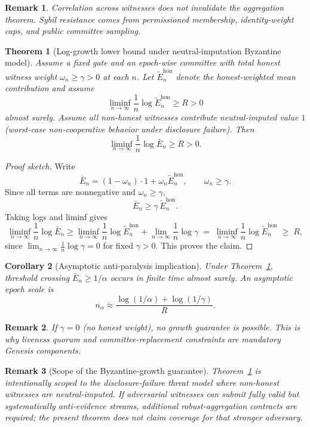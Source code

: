 \documentclass[11pt,a4paper]{article}
\newtheorem{theorem}{Theorem}[section]
\newtheorem{corollary}[theorem]{Corollary}
\newtheorem{remark}{Remark}[section]
\begin{document}
\begin{remark}
Correlation across witnesses does not invalidate the aggregation theorem.
Sybil resistance comes from permissioned membership, identity-weight caps, and public committee sampling.
\end{remark}

\begin{theorem}[Log-growth lower bound under neutral-imputation Byzantine model]
\label{thm:byz-growth}
Assume a fixed gate and an epoch-wise committee with total honest witness weight $\omega_n\ge\gamma>0$ at each $n$.
Let $\widetilde E_n^{\mathrm{hon}}$ denote the honest-weighted mean contribution and assume
\[
\liminf_{n\to\infty}\frac{1}{n}\log \widetilde E_n^{\mathrm{hon}}\ge R>0
\]
almost surely.
Assume all non-honest witnesses contribute neutral-imputed value $1$ (worst-case non-cooperative behavior under disclosure failure).
Then
\[
\liminf_{n\to\infty}\frac{1}{n}\log \bar E_n
\ge R>0.
\]
\end{theorem}
\begin{proof}[Proof sketch]
Write
\[
\bar E_n=(1-\omega_n)\cdot 1+\omega_n\widetilde E_n^{\mathrm{hon}},\qquad \omega_n\ge\gamma.
\]
Since all terms are nonnegative and $\omega_n\ge\gamma$,
\[
\bar E_n\ge \gamma\,\widetilde E_n^{\mathrm{hon}}.
\]
Taking logs and liminf gives
\[
\liminf_{n\to\infty}\frac{1}{n}\log\bar E_n
\ge
\liminf_{n\to\infty}\frac{1}{n}\log\widetilde E_n^{\mathrm{hon}}
+\lim_{n\to\infty}\frac{1}{n}\log\gamma
\;=\;
\liminf_{n\to\infty}\frac{1}{n}\log\widetilde E_n^{\mathrm{hon}}
\;\ge\;R,
\]
since $\lim_{n\to\infty}\frac{1}{n}\log\gamma=0$ for fixed $\gamma>0$.
This proves the claim.
\end{proof}

\begin{corollary}[Asymptotic anti-paralysis implication]
Under Theorem~\ref{thm:byz-growth}, threshold crossing $\bar E_n\ge 1/\alpha$ occurs in finite time almost surely.
An asymptotic epoch scale is
\[
n_\alpha \approx \frac{\log(1/\alpha)+\log(1/\gamma)}{R}.
\]
\end{corollary}

\begin{remark}
If $\gamma=0$ (no honest weight), no growth guarantee is possible.
This is why liveness quorum and committee-replacement constraints are mandatory Genesis components.
\end{remark}

\begin{remark}[Scope of the Byzantine-growth guarantee]
Theorem~\ref{thm:byz-growth} is intentionally scoped to the disclosure-failure threat model where non-honest witnesses are neutral-imputed.
If adversarial witnesses can submit fully valid but systematically anti-evidence streams, additional robust-aggregation contracts are required; the present theorem does not claim coverage for that stronger adversary.
\end{remark}
\end{document}
